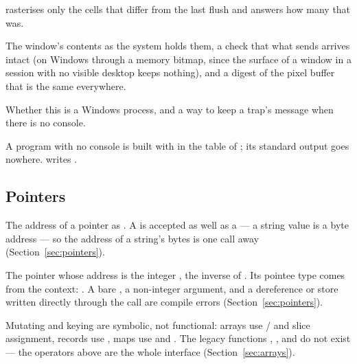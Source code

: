 \begin{description}[style=nextline,leftmargin=5.2em]
   rasterises only the cells that differ from the last flush
  and answers how many that was.
\item[\ic{gui.read\_back}, \ic{gui.verify\_present}, \ic{gui.checksum}] The
  window's contents as the system holds them, a check that what 
  sends arrives intact (on Windows through a memory bitmap, since the surface of
  a window in a session with no visible desktop keeps nothing), and a digest of
  the pixel buffer that is the same everywhere.
\item[\ic{gui.on\_windows()}, \ic{gui.redirect\_stderr(path)}] Whether this is a
  Windows process, and a way to keep a trap's message when there is no console.
\end{description}

\noindent A program with no console is built with  in the
\ic{[package]} table of ; its standard output goes nowhere.  writes
.

\subsection{Pointers}
\label{sec:builtin-pointers}

\begin{description}[style=nextline,leftmargin=5.2em]
\item[\ic{ptr\_addr(p)}] The address of a pointer as . A
   is accepted as well as a  --- a string value is a byte
  address --- so the address of a string's bytes is one call away
  (Section~\ref{sec:pointers}).
\item[\ic{ptr\_from(n)}] The pointer whose address is the integer , the
  inverse of . Its pointee type comes from the context:
  . A bare , a
  non-integer argument, and a dereference or store written directly through the
  call are compile errors (Section~\ref{sec:pointers}).
\end{description}

\noindent Mutating and keying are symbolic, not functional: arrays use
\ic{+=} / \ic{*=} and slice assignment, records use , maps use
 and
. The legacy functions , ,
 and  do not exist --- the operators above are
the whole interface (Section~\ref{sec:arrays}).

